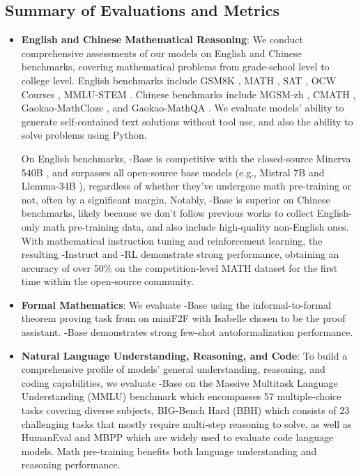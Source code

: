 \subsection{Summary of Evaluations and Metrics}
\begin{itemize}[topsep=0pt]
    \item \textbf{English and Chinese Mathematical Reasoning}:
    We conduct comprehensive assessments of our models on English and Chinese benchmarks, covering mathematical problems from grade-school level to college level.
    English benchmarks include GSM8K \citep{gsm8k}, MATH \citep{MATH}, SAT \citep{llemma}, OCW Courses \citep{minerva}, MMLU-STEM \citep{mmlu}.
    Chinese benchmarks include MGSM-zh \citep{mgsm}, CMATH \citep{wei2023cmath}, Gaokao-MathCloze \citep{agieval}, and Gaokao-MathQA \citep{agieval}.
    We evaluate models' ability to generate self-contained text solutions without tool use, and also the ability to solve problems using Python.
    
    On English benchmarks, \spmath-Base is competitive with the closed-source Minerva 540B \citep{minerva}, and surpasses all open-source base models (e.g., Mistral 7B \citep{mistral} and Llemma-34B \citep{llemma}), regardless of whether they've undergone math pre-training or not, often by a significant margin.
    Notably, \spmath-Base is superior on Chinese benchmarks, likely because we don't follow previous works \citep{minerva,llemma} to collect English-only math pre-training data, and also include high-quality non-English ones.
    With mathematical instruction tuning and reinforcement learning, the resulting \spmath-Instruct and \spmath-RL demonstrate strong performance, obtaining an accuracy of over 50\% on the competition-level MATH dataset for the first time within the open-source community.
    
    \item \textbf{Formal Mathematics}:
    We evaluate \spmath-Base using the informal-to-formal theorem proving task from \citep{dsp_proof} on miniF2F \citep{minif2f} with Isabelle \citep{isabelle} chosen to be the proof assistant.
    \spmath-Base demonstrates strong few-shot autoformalization performance.
    \item \textbf{Natural Language Understanding, Reasoning, and Code}:
    To build a comprehensive profile of models' general understanding, reasoning, and coding capabilities, we evaluate \spmath-Base on the Massive Multitask Language Understanding (MMLU) benchmark \citep{mmlu} which encompasses 57 multiple-choice tasks covering diverse subjects, BIG-Bench Hard (BBH) \citep{bbh} which consists of 23 challenging tasks that mostly require multi-step reasoning to solve, as well as HumanEval \citep{codex} and MBPP \citep{mbpp} which are widely used to evaluate code language models.
    Math pre-training benefits both language understanding and reasoning performance.
\end{itemize}

